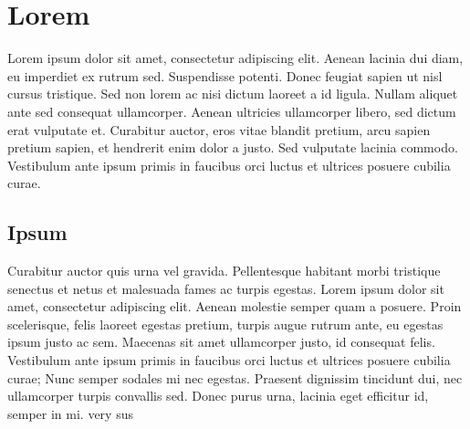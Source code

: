 \section{Lorem}
Lorem ipsum dolor sit amet, consectetur adipiscing elit. Aenean lacinia dui diam, eu imperdiet ex rutrum sed. Suspendisse potenti. Donec feugiat sapien ut nisl cursus tristique. Sed non lorem ac nisi dictum laoreet a id ligula. \parencite{knuthwebsite} Nullam aliquet ante sed consequat ullamcorper. Aenean ultricies ullamcorper libero, sed dictum erat vulputate et. Curabitur auctor, eros vitae blandit pretium, arcu sapien pretium sapien, et hendrerit enim dolor a justo. Sed vulputate lacinia commodo. Vestibulum ante ipsum primis in faucibus orci luctus et ultrices posuere cubilia curae. \parencite{latexcompanion}

\subsection{Ipsum}
Curabitur auctor quis urna vel gravida. Pellentesque habitant morbi tristique senectus et netus et malesuada fames ac turpis egestas. Lorem ipsum dolor sit amet, consectetur adipiscing elit. Aenean molestie semper quam a posuere. Proin scelerisque, felis laoreet egestas pretium, turpis augue rutrum ante, eu egestas ipsum justo ac sem. Maecenas sit amet ullamcorper justo, id consequat felis. Vestibulum ante ipsum primis in faucibus orci luctus et ultrices posuere cubilia curae; Nunc semper sodales mi nec egestas. Praesent dignissim tincidunt dui, nec ullamcorper turpis convallis sed. Donec purus urna, lacinia eget efficitur id, semper in mi. very sus  \parencite[p. 10]{einstein}


